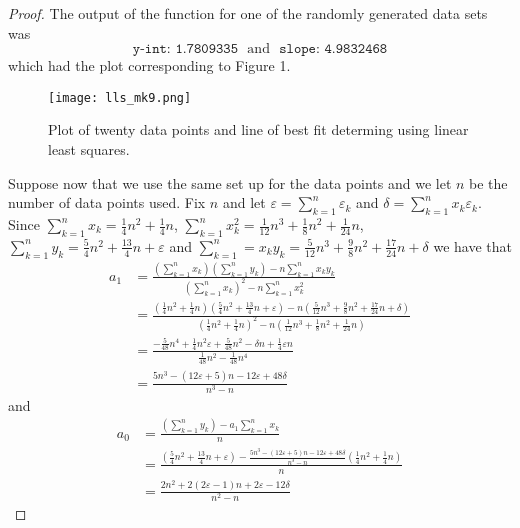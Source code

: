 \documentclass[8pt]{article}
\theoremstyle{definition}
\begin{document}
\begin{proof}
The output of the function for one of the randomly generated data sets was $$\texttt{y-int:  1.7809335} \ \ \ \text{and} \ \ \ \texttt{slope:  4.9832468}$$ which had the plot corresponding to Figure 1.

\begin{figure}[H]
	\texttt{[image: lls\_mk9.png]}
	\vspace{-10mm}
	\caption{Plot of twenty data points and line of best fit determing using linear least squares.}
	\label{Figure 1}
\end{figure}

Suppose now that we use the same set up for the data points and we let $n$ be the number of data points used. Fix $n$ and let $\varepsilon = \sum_{k = 1}^{n} \varepsilon_k$ and $\delta = \sum_{k = 1}^{n} x_k \varepsilon_k$. Since $\sum_{k=1}^{n} x_k = \frac{1}{4} n^2 + \frac{1}{4} n$, $\sum_{k=1}^{n} x_{k}^2 = \frac{1}{12} n^3 + \frac{1}{8} n^2 + \frac{1}{24} n$, $\sum_{k=1}^{n} y_k = \frac{5}{4} n^2 + \frac{13}{4} n + \varepsilon$ and $\sum_{k=1}^{n} = x_k y_k = \frac{5}{12} n^3 + \frac{9}{8} n^2 + \frac{17}{24} n + \delta$ we have that 
\begin{align*}
a_1 &= \frac{\left( \sum_{k = 1}^{n} x_k \right) \left( \sum_{k = 1}^{n} y_k \right) - n \sum_{k = 1}^{n} x_k y_k}{\left( \sum_{k = 1}^{n} x_k \right)^2 - n \sum_{k = 1}^{n} x_{k}^2} \\
&= \frac{\left( \frac{1}{4} n^2 + \frac{1}{4} n \right) \left( \frac{5}{4} n^2 + \frac{13}{4} n + \varepsilon \right) - n \left( \frac{5}{12} n^3 + \frac{9}{8} n^2 + \frac{17}{24} n + \delta \right)}{\left( \frac{1}{4} n^2 + \frac{1}{4} n \right)^2 - n \left( \frac{1}{12} n^3 + \frac{1}{8} n^2 + \frac{1}{24} n \right)} \\
&= \frac{-\frac{5}{48}n^4 + \frac{1}{4} n^2 \varepsilon + \frac{5}{48} n^2 - \delta n + \frac{1}{4} \varepsilon n}{\frac{1}{48}n^2 - \frac{1}{48} n^4} \\
&= \frac{5 n^3 - (12 \varepsilon + 5) n - 12 \varepsilon + 48 \delta}{n^3 - n}
\end{align*}
and
\begin{align*}
a_0 &= \frac{\left( \sum_{k = 1}^{n} y_k \right) - a_1 \sum_{k = 1}^{n} x_k}{n} \\
&= \frac{\left( \frac{5}{4} n^2 + \frac{13}{4} n + \varepsilon \right) - \frac{5 n^3 - (12 \varepsilon + 5) n - 12 \varepsilon + 48 \delta}{n^3 - n} \left(\frac{1}{4} n^2 + \frac{1}{4} n \right)}{n} \\
&= \frac{2 n^2 + 2 (2 \varepsilon - 1)n + 2 \varepsilon - 12 \delta}{n^2 - n}
\end{align*}


\end{proof}
\end{document}
